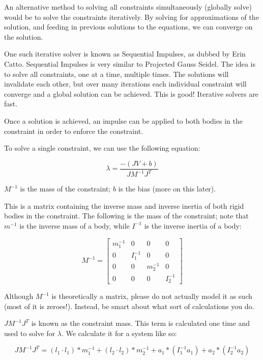 An alternative method to solving all constraints simultaneously (globally solve) would be to solve the constraints iteratively. By solving for approximations of the solution, and feeding in previous solutions to the equations, we can converge on the solution.

One such iterative solver is known as Sequential Impulses, as dubbed by Erin Catto. Sequential Impulses is very similar to Projected Gauss Seidel. The idea is to solve all constraints, one at a time, multiple times. The solutions will invalidate each other, but over many iterations each individual constraint will converge and a global solution can be achieved. This is good! Iterative solvers are fast.

Once a solution is achieved, an impulse can be applied to both bodies in the constraint in order to enforce the constraint.

To solve a single constraint, we can use the following equation:

\begin{equation}
\lambda = \frac{-(JV + b)}{JM^{-1}J^T}
\label{eq17}
\end{equation}

\(M^{-1}\) is the mass of the constraint; \(b\) is the bias (more on this later).

This is a matrix containing the inverse mass and inverse inertia of both rigid bodies in the constraint. The following is the mass of the constraint; note that \(m^{-1}\) is the inverse mass of a body, while \(I^{-1}\) is the inverse inertia of a body:

\begin{equation} M^{-1} =
\begin{bmatrix}
m_1 ^{-1} & 0 & 0 & 0 \\
0 & I_1 ^{-1} & 0 & 0 \\
0 & 0 & m_2 ^{-1} & 0 \\
0 & 0 & 0 & I_2 ^{-1}
\end{bmatrix}
\label{eq18}
\end{equation}

Although \(M^{-1}\) is theoretically a matrix, please do not actually model it as such (most of it is zeroes!). Instead, be smart about what sort of calculations you do.

\(JM^{-1}J^T\) is known as the constraint mass. This term is calculated one time and used to solve for \(\lambda\). We calculate it for a system like so:

\begin{equation}
JM^{-1}J^T = (l_1 \cdot l_1) * m_1 ^{-1} + (l_2 \cdot l_2) * m_2 ^{-1} + a_1 * (I_1 ^{-1} a_1) + a_2 * (I_2 ^{-1} a_2)
\label{eq19}
\end{equation}

